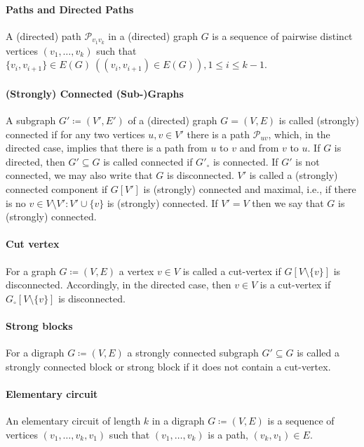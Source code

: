\documentclass[pdflatex]{sn-jnl}
\theoremstyle{thmstyleone}%
\theoremstyle{examplesty}%
\theoremstyle{thmstylethree}%
\begin{document}
\paragraph{Paths and Directed Paths} A (directed) path $\mathcal{P}_{v_1v_k}$ in a (directed) graph $G$ is 
a sequence of pairwise distinct vertices $(v_1,\ldots, v_k)$ such that $\{v_i, v_{i+1}\}\in E(G) \  ((v_i, v_{i+1})\in E(G)), 
1\leq i\leq k-1$.

\paragraph{(Strongly) Connected (Sub-)Graphs} A subgraph $G'\coloneqq (V', E')$ of a (directed) graph 
$G=(V,E)$ is called (strongly) connected if for any two vertices $u,v\in V'$ there is a path 
$\mathcal{P}_{uv}$, which, in the directed case, implies that there is a path from $u$ to $v$ and 
from $v$ to $u$. If $G$ is directed, then $G'\subseteq G$ is called connected if $G'_\circ$ is connected. 
If $G'$ is not connected, we may also write that $G$ is disconnected. $V'$ is called a (strongly) connected 
component if $G[V']$ is (strongly) connected and maximal, i.e., if there is no $v\in V\setminus V': V'\cup \{v\}$ 
is (strongly) connected. If $V'=V$ then we say that $G$ is (strongly) connected. 

\paragraph{Cut vertex} For a graph $G\coloneqq (V, E)$ a vertex $v\in V$ is called a cut-vertex if $G[V\setminus \{v\}]$ 
is disconnected. Accordingly, in the directed case, then $v\in V$ is a cut-vertex if $G_\circ[V\setminus \{v\}]$ is 
disconnected. 

\paragraph{Strong blocks} For a digraph $G\coloneqq (V, E)$ a strongly connected subgraph $G'\subseteq G$ is 
called a strongly connected block or strong block if it does not contain a cut-vertex.

\paragraph{Elementary circuit} An elementary circuit of length $k$ in a digraph $G\coloneqq (V,E)$ is a sequence 
of vertices $(v_1,\ldots, v_k, v_1)$ such that $(v_1,\ldots, v_k)$ is a path, $(v_k, v_1) \in E$. 
\end{document}
